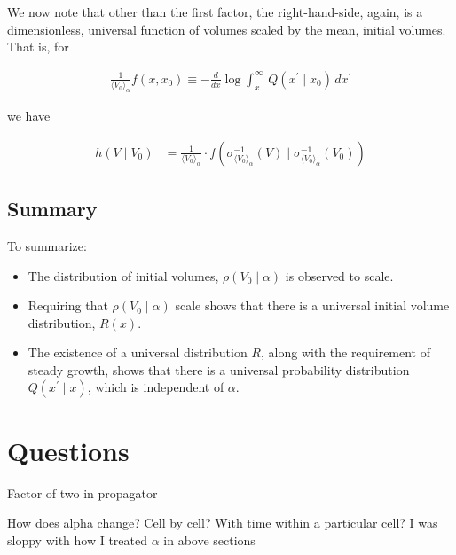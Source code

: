 \documentclass{article}
\begin{document}
We now note that other than the first factor, the right-hand-side, again, is a dimensionless, universal function of volumes scaled by the mean, initial volumes. That is, for

\begin{align}
\frac{1}{\langle V_0 \rangle_\alpha} f(x, x_0) \equiv -  \frac{d}{dx} \log \int^{\infty}_{x} \, Q( x^\prime \mid x_0 ) \, dx^\prime  
\end{align}

we have

\begin{align}
h(V \mid V_0) &= \frac{1}{\langle V_0 \rangle_\alpha} \cdot f\left( \sigma_{\langle V_0 \rangle_\alpha}^{-1}(V) \mid \sigma_{\langle V_0 \rangle_\alpha}^{-1}(V_0) \right)
\end{align}

\subsection{Summary}

To summarize:

\begin{itemize}
	\item The distribution of initial volumes, $\rho(V_0 \mid \alpha)$ is observed to scale.
	\item Requiring that $\rho(V_0 \mid \alpha)$ scale shows that there is a universal initial volume distribution, $R(x)$.
	\item The existence of a universal distribution $R$, along with the requirement of steady growth, shows that there is a universal probability distribution $Q(x^\prime \mid x)$, which is independent of $\alpha$. 
\end{itemize}

\section{Questions}

Factor of two in propagator

How does alpha change? Cell by cell? With time within a particular cell? I was sloppy with how I treated $\alpha$ in above sections

{}

\end{document}
